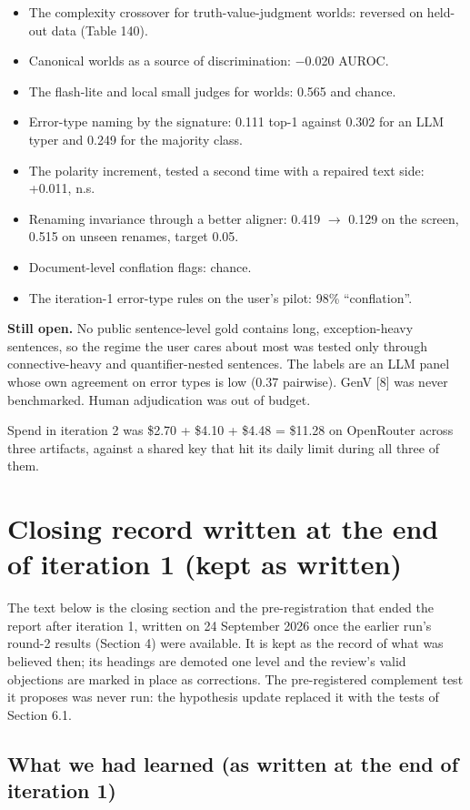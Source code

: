 \documentclass[11pt,letterpaper]{article}
\begin{document}
\begin{itemize}
\item {}The complexity crossover for truth-value-judgment worlds: reversed on held-out data (Table 140).
\item {}Canonical worlds as a source of discrimination: $-$0.020 AUROC.
\item {}The flash-lite and local small judges for worlds: 0.565 and chance.
\item {}Error-type naming by the signature: 0.111 top-1 against 0.302 for an LLM typer and 0.249 for the majority class.
\item {}The polarity increment, tested a second time with a repaired text side: +0.011, n.s.
\item {}Renaming invariance through a better aligner: 0.419 $\rightarrow$ 0.129 on the screen, 0.515 on unseen renames, target 0.05.
\item {}Document-level conflation flags: chance.
\item {}The iteration-1 error-type rules on the user's pilot: 98\% ``conflation''.
\end{itemize}
\textbf{Still open.} No public sentence-level gold contains long, exception-heavy sentences, so the regime the user cares about most was tested only through connective-heavy and quantifier-nested sentences. The labels are an LLM panel whose own agreement on error types is low (0.37 pairwise). GenV [8] was never benchmarked. Human adjudication was out of budget.

Spend in iteration 2 was \$2.70 + \$4.10 + \$4.48 = \$11.28 on OpenRouter across three artifacts, against a shared key that hit its daily limit during all three of them.

\section{Closing record written at the end of iteration 1 (kept as written)}

The text below is the closing section and the pre-registration that ended the report after iteration 1, written on 24 September 2026 once the earlier run's round-2 results (Section 4) were available. It is kept as the record of what was believed then; its headings are demoted one level and the review's valid objections are marked in place as corrections. The pre-registered complement test it proposes was never run: the hypothesis update replaced it with the tests of Section 6.1.

\subsection{What we had learned (as written at the end of iteration 1)}
\end{document}
